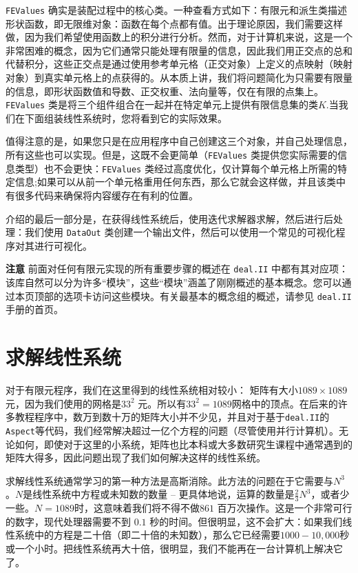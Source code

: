\documentclass[12pt, a4paper]{article}
\numberwithin{equation}{section} %
\begin{document}
\verb|FEValues| 确实是装配过程中的核心类。一种查看方式如下：有限元和派生类描述形状函数，即无限维对象：函数在每个点都有值。出于理论原因，我们需要这样做，因为我们希望使用函数上的积分进行分析。然而，对于计算机来说，这是一个非常困难的概念，因为它们通常只能处理有限量的信息，因此我们用正交点的总和代替积分，这些正交点是通过使用参考单元格（正交对象）上定义的点映射（映射对象）到真实单元格上的点获得的。从本质上讲，我们将问题简化为只需要有限量的信息，即形状函数值和导数、正交权重、法向量等，仅在有限的点集上。\verb|FEValues|  类是将三个组件组合在一起并在特定单元上提供有限信息集的类$K$.当我们在下面组装线性系统时，您将看到它的实际效果。

值得注意的是，如果您只是在应用程序中自己创建这三个对象，并自己处理信息，所有这些也可以实现。但是，这既不会更简单（\verb|FEValues|  类提供您实际需要的信息类型）也不会更快：\verb|FEValues|  类经过高度优化，仅计算每个单元格上所需的特定信息;如果可以从前一个单元格重用任何东西，那么它就会这样做，并且该类中有很多代码来确保将内容缓存在有利的位置。

介绍的最后一部分是，在获得线性系统后，使用迭代求解器求解，然后进行后处理：我们使用 \verb|DataOut| 类创建一个输出文件，然后可以使用一个常见的可视化程序对其进行可视化。

\textbf{注意}
前面对任何有限元实现的所有重要步骤的概述在 \verb|deal.II| 中都有其对应项：该库自然可以分为许多“模块”，这些“模块”涵盖了刚刚概述的基本概念。您可以通过本页顶部的选项卡访问这些模块。有关最基本的概念组的概述，请参见 \verb|deal.II|手册的首页。

\newpage
\section{求解线性系统}
对于有限元程序，我们在这里得到的线性系统相对较小： 矩阵有大小$1089 \times 1089
$元，因为我们使用的网格是$33^2$ 元。所以有$33^2=1089$网格中的顶点。在后来的许多教程程序中，数万到数十万的矩阵大小并不少见，并且对于基于\verb|deal.II|的\verb|Aspect|等代码，我们经常解决超过一亿个方程的问题（尽管使用并行计算机）。无论如何，即使对于这里的小系统，矩阵也比本科或大多数研究生课程中通常遇到的矩阵大得多，因此问题出现了我们如何解决这样的线性系统。

求解线性系统通常学习的第一种方法是高斯消除。此方法的问题在于它需要与$N^3$。$N$是线性系统中方程或未知数的数量 – 更具体地说，运算的数量是$\frac 23 N^3$，或者少一些。$N=1089$时，这意味着我们将不得不做$861$
百万次操作。这是一个非常可行的数字，现代处理器需要不到 $0.1$ 秒的时间。但很明显，这不会扩大：如果我们线性系统中的方程是二十倍（即二十倍的未知数），那么它已经需要$1000 -10,000$秒或一个小时。把线性系统再大十倍，很明显，我们不能再在一台计算机上解决它了。
\end{document}

